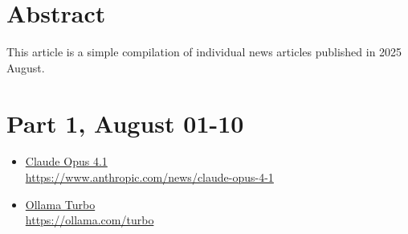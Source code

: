 





\section*{Abstract}
This article is a simple compilation of individual news articles published in 2025 August.



\section*{Part 1, August 01-10}

\providecommand{\makenewslink}[3]{%
        \href{#2}{#3}\\\nopagebreak%
        \href{#2}{\small#2}%
    \par\medskip%
}

\begin{itemize}
    \item \makenewslink{www.anthropic.com}{https://www.anthropic.com/news/claude-opus-4-1}{Claude Opus 4.1}
    \item \makenewslink{ollama.com}{https://ollama.com/turbo}{Ollama Turbo}
\end{itemize}











